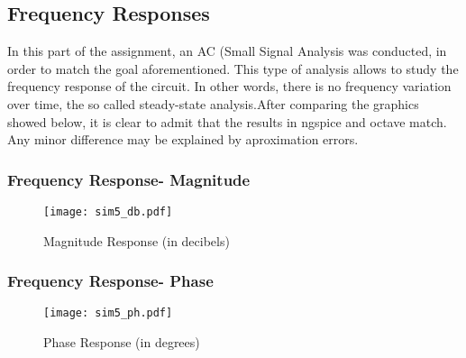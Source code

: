 \clearpage
\subsection{Frequency Responses}

In this part of the assignment, an AC (Small Signal Analysis was conducted, in order to match the goal aforementioned. This type of analysis allows to study the frequency response of the circuit. In other words, there is no frequency variation over time, the so called steady-state analysis.After comparing the graphics showed below, it is clear to admit that the results in ngspice and octave match. Any minor difference may be explained by aproximation errors.

\subsubsection{Frequency Response- Magnitude}
\begin{figure}[h] \centering
\texttt{[image: sim5\_db.pdf]}
\caption{Magnitude Response (in decibels)}
\label{fig:sim5_db}
\end{figure}
\subsubsection{Frequency Response- Phase}
\begin{figure}[h] \centering
\texttt{[image: sim5\_ph.pdf]}
\caption{Phase Response (in degrees)}
\label{fig:sim5_ph}
\end{figure}
\newpage






